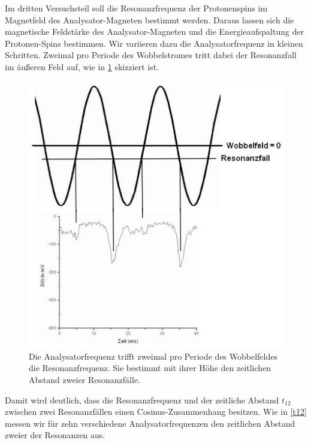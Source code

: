 \documentclass[paper=a4,
	fontsize=10pt,
	DIV=18,
	twocolumn,
	parskip=half
	]{scrartcl}
\numberwithin{equation}{section}    %
\begin{document}
Im dritten Versuchsteil soll die Resonanzfrequenz der Protonenspins im Magnetfeld des Analysator-Magneten bestimmt werden.
Daraus lassen sich die magnetische Feldstärke des Analysator-Magneten und die Energieaufspaltung der Protonen-Spins bestimmen.
Wir variieren dazu die Analysatorfrequenz in kleinen Schritten.
Zweimal pro Periode des Wobbelstromes tritt dabei der Resonanzfall im äußeren Feld auf, wie in \cref{wobbel} skizziert ist.
\begin{figure}[t!]
	\begin{center}
		\includegraphics[width=0.7\columnwidth]{Bilder/Wobbel}
		\caption{Die Analysatorfrequenz trifft zweimal pro Periode des Wobbelfeldes die Resonanzfrequenz. Sie bestimmt mit ihrer Höhe den zeitlichen Abstand zweier Resonanzfälle.}
		\label{wobbel}
	\end{center}
\end{figure}
Damit wird deutlich, dass die Resonanzfrequenz und der zeitliche Abstand $t_{12}$ zwischen zwei Resonanzfällen einen Cosinus-Zusammenhang besitzen.
Wie in \cref{t12} messen wir für zehn verschiedene Analysatorfrequenzen den zeitlichen Abstand zweier der Resonanzen aus.
\end{document}
